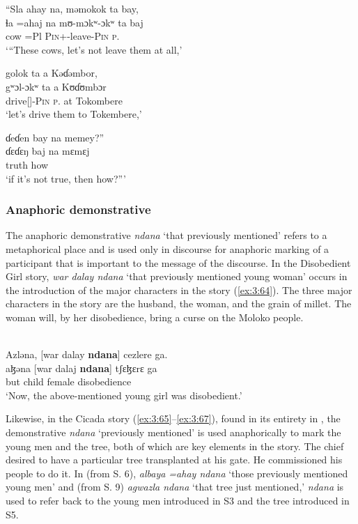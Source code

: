  \medskip
  “Sla  ahay  na,  məmokok  ta  bay,  \\
\gll ɬa   =ahaj   na   mʊ-mɔkʷ-ɔkʷ ta baj \\
cow   =Pl  {\PSP}  \textsc{Pin}+{\HOR}-leave-\textsc{Pin}   \textsc{p}.{\DO}   {\NEG}   \\
\glt ‘“These cows, let’s not leave them at all,’

\medskip
golok ta  a  Kəɗəmbor,\\
\gll gʷɔl-ɔkʷ ta  a  Kʊɗʊmbɔr\\
     drive[{\IMP}]-\textsc{Pin} \textsc{p}.{\DO}   at   Tokombere\\
\glt ‘let’s drive them to Tokembere,’

\medskip
ɗeɗen  bay  na  memey?”\\
\gll ɗɛɗɛŋ   baj     na      mɛmɛj\\
truth  {\NEG}   {\PSP}   how \\   
\glt  ‘if it’s not true, then how?”’
\z

\subsubsection{Anaphoric demonstrative}\label{sec:3.2.2.2}
The anaphoric demonstrative \textit{ndana} ‘that previously mentioned’ refers to a metaphorical place and is used only in discourse for anaphoric marking of a participant that is important to the message of the discourse. In the Disobedient Girl story, \textit{war dalay ndana} ‘that previously mentioned young woman’ occurs in the introduction of the major characters in the story (\ref{ex:3:64}). The three major characters in the story are the husband, the woman, and the grain of millet. The woman will, by her disobedience, bring a curse on the Moloko people. 

\ea \label{ex:3:64}\\
Azləna,  [war  dalay  \textbf{ndana}]  cezlere  ga.\\
\gll  aɮəna  [war   dalaj   \textbf{ndana}]  tʃɛɮɛrɛ         ga\\
      but  child      female    {\DEM}  disobedience   {\ADJ}\\
\glt  ‘Now, the above-mentioned young girl was disobedient.’
\z

Likewise, in the Cicada story (\ref{ex:3:65}--\ref{ex:3:67}), found in its entirety in , the demonstrative \textit{ndana} ‘previously mentioned’ is used anaphorically to mark the young men and the tree, both of which are key elements in the story. The chief desired to have a particular tree transplanted at his gate. He commissioned his people to do it. In  (from S. 6), \textit{albaya =ahay ndana} ‘those previously mentioned young men’ and  (from S. 9)  \textit{agwazla ndana} ‘that tree just mentioned,’ \textit{ndana} is used to refer back to the young men introduced in S3 and the tree introduced in S5. 

